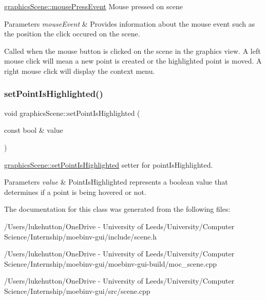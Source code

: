 \mbox{\hyperlink{classgraphics_scene_a45ca641319ec6accb1574f52539e7517}{graphics\+Scene\+::mouse\+Press\+Event}} Mouse pressed on scene 


\begin{DoxyParams}{Parameters}
{\em mouse\+Event} & Provides information about the mouse event such as the position the click occured on the scene.\\
\hline
\end{DoxyParams}
Called when the mouse button is clicked on the scene in the graphics view. A left mouse click will mean a new point is created or the highlighted point is moved. A right mouse click will display the context menu. \mbox{\label{classgraphics_scene_a96915f909391e379b8c6c880d1d3acc6}} 
\subsubsection{\texorpdfstring{set\+Point\+Is\+Highlighted()}{setPointIsHighlighted()}}
{\footnotesize\ttfamily void graphics\+Scene\+::set\+Point\+Is\+Highlighted (\begin{DoxyParamCaption}\item[{const bool \&}]{value }\end{DoxyParamCaption})}



\mbox{\hyperlink{classgraphics_scene_a96915f909391e379b8c6c880d1d3acc6}{graphics\+Scene\+::set\+Point\+Is\+Highlighted}} setter for point\+Is\+Highlighted. 


\begin{DoxyParams}{Parameters}
{\em value} & Point\+Is\+Highlighted represents a boolean value that determines if a point is being hovered or not. \\
\hline
\end{DoxyParams}


The documentation for this class was generated from the following files\+:\begin{DoxyCompactItemize}
\item 
/\+Users/lukehutton/\+One\+Drive -\/ University of Leeds/\+University/\+Computer Science/\+Internship/moebinv-\/gui/include/scene.\+h\item 
/\+Users/lukehutton/\+One\+Drive -\/ University of Leeds/\+University/\+Computer Science/\+Internship/moebinv-\/gui/moebinv-\/gui-\/build/moc\+\_\+scene.\+cpp\item 
/\+Users/lukehutton/\+One\+Drive -\/ University of Leeds/\+University/\+Computer Science/\+Internship/moebinv-\/gui/src/scene.\+cpp\end{DoxyCompactItemize}
